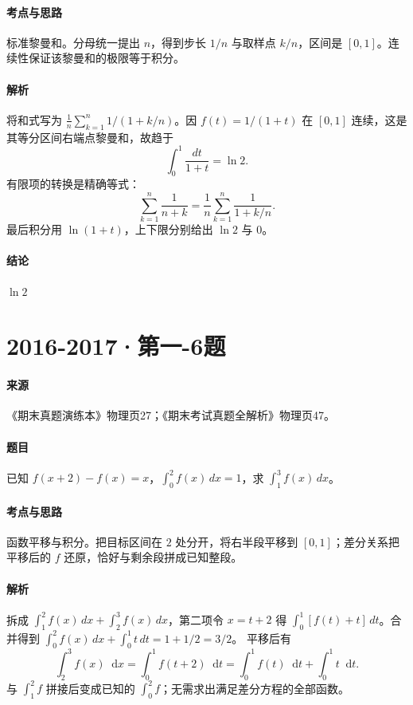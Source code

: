 \documentclass[UTF8,fontset=fandol,12pt,oneside,openany]{ctexrep}
\newcommand{\dd}{\mathop{}\!\mathrm d}
\theoremstyle{definition}
\begin{document}
\paragraph{考点与思路}
标准黎曼和。分母统一提出 $n$，得到步长 $1/n$ 与取样点 $k/n$，区间是 $[0,1]$。连续性保证该黎曼和的极限等于积分。
\paragraph{解析}
将和式写为 $\frac1n\sum_{k=1}^n1/(1+k/n)$。因 $f(t)=1/(1+t)$ 在 $[0,1]$ 连续，这是其等分区间右端点黎曼和，故趋于 \[\int_0^1\frac{dt}{1+t}=\ln2.\]
有限项的转换是精确等式：
\[
\sum_{k=1}^n\frac1{n+k}=\frac1n\sum_{k=1}^n\frac1{1+k/n}.
\]
最后积分用 $\ln(1+t)$，上下限分别给出 $\ln2$ 与 $0$。
\paragraph{结论}
$\ln2$

\par\addvspace{18pt}\noindent\begin{minipage}{\linewidth}
\section{2016-2017·第一-6题}
\label{exam:11:q30}
\paragraph{来源} 《期末真题演练本》物理页27；《期末考试真题全解析》物理页47。
\paragraph{题目}
已知 $f(x+2)-f(x)=x$，$\int_0^2f(x)\,dx=1$，求 $\int_1^3f(x)\,dx$。
\end{minipage}\par
\paragraph{考点与思路}
函数平移与积分。把目标区间在 $2$ 处分开，将右半段平移到 $[0,1]$；差分关系把平移后的 $f$ 还原，恰好与剩余段拼成已知整段。
\paragraph{解析}
拆成 $\int_1^2f(x)\,dx+\int_2^3f(x)\,dx$，第二项令 $x=t+2$ 得 $\int_0^1[f(t)+t]\,dt$。合并得到 $\int_0^2f(x)\,dx+\int_0^1t\,dt=1+1/2=3/2$。
平移后有
\[
\int_2^3f(x)\dd x=\int_0^1f(t+2)\dd t
=\int_0^1f(t)\dd t+\int_0^1t\dd t.
\]
与 $\int_1^2f$ 拼接后变成已知的 $\int_0^2f$；无需求出满足差分方程的全部函数。
\end{document}

